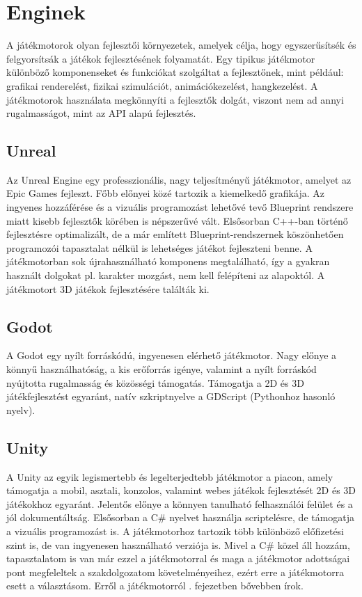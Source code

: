 \documentclass[]{thesis-ekf}
\theoremstyle{definition}
\theoremstyle{remark}
\begin{document}
\section{Enginek}

A játékmotorok olyan fejlesztői környezetek, amelyek célja, hogy egyszerűsítsék és felgyorsítsák a játékok fejlesztésének folyamatát. Egy tipikus játékmotor különböző komponenseket és funkciókat szolgáltat a fejlesztőnek, mint például: grafikai renderelést, fizikai szimulációt, animációkezelést, hangkezelést. A játékmotorok használata megkönnyíti a fejlesztők dolgát, viszont nem ad annyi rugalmasságot, mint az API alapú fejlesztés. \cite{WikipediaGameEngine}

\subsection{Unreal}

Az Unreal Engine egy professzionális, nagy teljesítményű játékmotor, amelyet az Epic Games fejleszt. Főbb előnyei közé tartozik a kiemelkedő grafikája. Az ingyenes hozzáférése és a vizuális programozást lehetővé tevő Blueprint rendszere miatt kisebb fejlesztők körében is népszerűvé vált. Elsősorban C++-ban történő fejlesztésre optimalizált, de a már említett Blueprint-rendszernek köszönhetően programozói tapasztalat nélkül is lehetséges játékot fejleszteni benne. A játékmotorban sok újrahasználható komponens megtalálható, így a gyakran használt dolgokat pl. karakter mozgást, nem kell felépíteni az alapoktól. A játékmotort 3D játékok fejlesztésére találták ki. \cite{WikipediaUnreal} \cite{UnrealEngine}

\subsection{Godot}

A Godot egy nyílt forráskódú, ingyenesen elérhető játékmotor. Nagy előnye a könnyű használhatóság, a kis erőforrás igénye, valamint a nyílt forráskód nyújtotta rugalmasság és közösségi támogatás. Támogatja a 2D és 3D játékfejlesztést egyaránt, natív szkriptnyelve a GDScript (Pythonhoz hasonló nyelv). \cite{Godot} \cite{GitHubGodot}

\subsection{Unity}

A Unity az egyik legismertebb és legelterjedtebb játékmotor a piacon, amely támogatja a mobil, asztali, konzolos, valamint webes játékok fejlesztését 2D és 3D játékokhoz egyaránt. Jelentős előnye a könnyen tanulható felhasználói felület és a jól dokumentáltság. Elsősorban a C\# nyelvet használja scriptelésre, de támogatja a vizuális programozást is. A játékmotorhoz tartozik több különböző előfizetési szint is, de van ingyenesen használható verziója is.  Mivel a C\# közel áll hozzám, tapasztalatom is van már ezzel a játékmotorral és maga a játékmotor adottságai pont megfeleltek a szakdolgozatom követelményeihez, ezért erre a játékmotorra esett a választásom. Erről a játékmotorról . fejezetben bővebben írok. \cite{Unity} \cite{WikipediaUnity}
\end{document}
